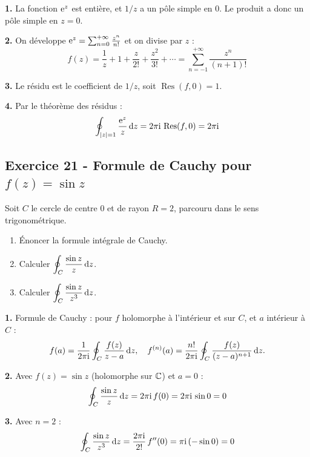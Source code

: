 \documentclass[12pt,a4paper]{article}
\begin{document}
\begin{boitecorrige}
\textbf{1.} La fonction $\mathrm{e}^z$ est entière, et $1/z$ a un pôle simple en 0. Le produit a donc un pôle simple en $z=0$.

\textbf{2.} On développe $\mathrm{e}^z = \sum_{n=0}^{+\infty}\frac{z^n}{n!}$ et on divise par $z$ :
\[
f(z) = \frac{1}{z} + 1 + \frac{z}{2!} + \frac{z^2}{3!} + \cdots = \sum_{n=-1}^{+\infty}\frac{z^n}{(n+1)!}
\]

\textbf{3.} Le résidu est le coefficient de $1/z$, soit $\operatorname{Res}(f,0) = 1$.

\textbf{4.} Par le théorème des résidus :
\[
\oint_{|z|=1}\frac{\mathrm{e}^z}{z}\,\mathrm{d} z = 2\pi\mathrm{i}\,\operatorname{Res}(f,0) = 2\pi\mathrm{i}
\]
\end{boitecorrige}

\subsection*{Exercice 21 - Formule de Cauchy pour $f(z)=\sin z$ \niveau{\facile}}

\begin{boiteexercice}
Soit $C$ le cercle de centre 0 et de rayon $R=2$, parcouru dans le sens trigonométrique.
\begin{enumerate}
  \item Énoncer la formule intégrale de Cauchy.
  \item Calculer $\displaystyle\oint_C \frac{\sin z}{z}\,\mathrm{d} z$.
  \item Calculer $\displaystyle\oint_C \frac{\sin z}{z^3}\,\mathrm{d} z$.
\end{enumerate}
\end{boiteexercice}

\begin{boitecorrige}
\textbf{1.} Formule de Cauchy : pour $f$ holomorphe à l'intérieur et sur $C$, et $a$ intérieur à $C$ :
\[
f(a) = \frac{1}{2\pi\mathrm{i}}\oint_C\frac{f(z)}{z-a}\,\mathrm{d} z,\quad
f^{(n)}(a) = \frac{n!}{2\pi\mathrm{i}}\oint_C\frac{f(z)}{(z-a)^{n+1}}\,\mathrm{d} z.
\]

\textbf{2.} Avec $f(z) = \sin z$ (holomorphe sur $\mathbb{C}$) et $a=0$ :
\[
\oint_C \frac{\sin z}{z}\,\mathrm{d} z = 2\pi\mathrm{i}\,f(0) = 2\pi\mathrm{i}\,\sin 0 = 0
\]

\textbf{3.} Avec $n=2$ :
\[
\oint_C \frac{\sin z}{z^3}\,\mathrm{d} z = \frac{2\pi\mathrm{i}}{2!}\,f''(0) = \pi\mathrm{i}\,(-\sin 0) = 0
\]
\end{boitecorrige}
\end{document}
